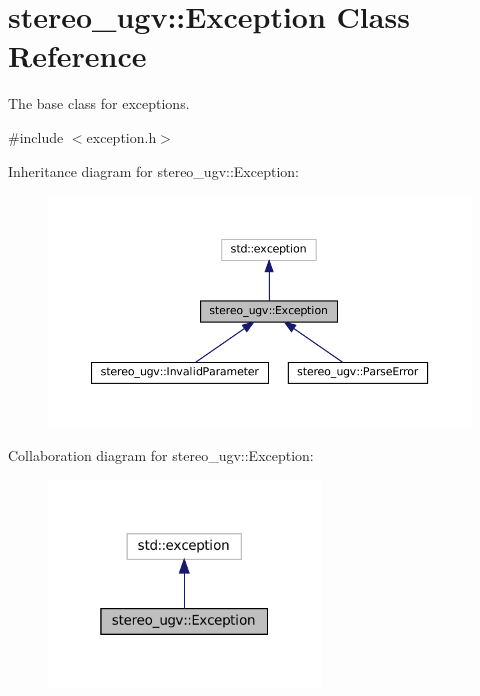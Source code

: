 \hypertarget{classstereo__ugv_1_1Exception}{}\section{stereo\+\_\+ugv\+:\+:Exception Class Reference}
\label{classstereo__ugv_1_1Exception}


The base class for exceptions.  




{\ttfamily \#include $<$exception.\+h$>$}



Inheritance diagram for stereo\+\_\+ugv\+:\+:Exception\+:
\nopagebreak
\begin{figure}[H]
\begin{center}
\leavevmode
\includegraphics[width=350pt]{classstereo__ugv_1_1Exception__inherit__graph}
\end{center}
\end{figure}


Collaboration diagram for stereo\+\_\+ugv\+:\+:Exception\+:
\nopagebreak
\begin{figure}[H]
\begin{center}
\leavevmode
\includegraphics[width=205pt]{classstereo__ugv_1_1Exception__coll__graph}
\end{center}
\end{figure}
